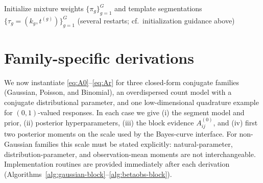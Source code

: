 \begin{algorithm}[H]
\caption{Latent-template EM for grouped segmentation (log-space)}
\label{alg:multi-em}
Initialize mixture weights $\{\pi_g\}_{g=1}^G$ and template segmentations $\{\tau_g=(k_g,t^{(g)})\}_{g=1}^G$ (several restarts; cf.\ initialization guidance above)\;
\end{algorithm}

\section{Family-specific derivations}
\label{sec:families}

We now instantiate \eqref{eq:A0}--\eqref{eq:Ar} for three closed-form conjugate families
(Gaussian, Poisson, and Binomial), an overdispersed count model with a conjugate distributional
parameter, and one low-dimensional quadrature example for $(0,1)$-valued responses. In each case
we give (i) the segment model and prior, (ii) posterior hyperparameters, (iii) the block evidence
$A^{(0)}_{ij}$, and (iv) first two posterior moments on the scale used by the Bayes-curve
interface. For non-Gaussian families this scale must be stated explicitly: natural-parameter,
distribution-parameter, and observation-mean moments are not interchangeable.
Implementation routines are provided immediately after each derivation
(Algorithms~\ref{alg:gaussian-block}--\ref{alg:betaobs-block}).

